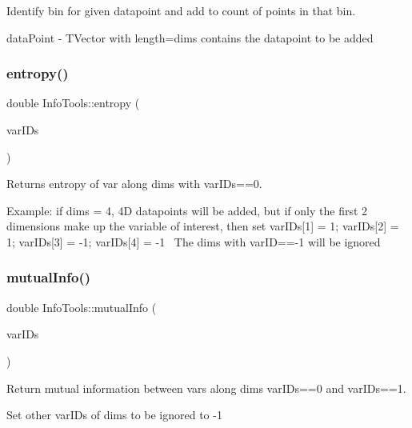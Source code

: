 Identify bin for given datapoint and add to count of points in that bin. 

data\+Point -\/ T\+Vector with length=dims contains the datapoint to be added \mbox{\label{class_info_tools_a83c1cad1553e27907dbeecde00e76660}} 
\subsubsection{\texorpdfstring{entropy()}{entropy()}}
{\footnotesize\ttfamily double Info\+Tools\+::entropy (\begin{DoxyParamCaption}\item[{T\+Vector$<$ int $>$ \&}]{var\+I\+Ds }\end{DoxyParamCaption})\hspace{0.3cm}{\ttfamily [inline]}}



Returns entropy of var along dims with var\+I\+Ds==0. 

Example\+: if dims = 4, 4D datapoints will be added, but if only the first 2 dimensions make up the variable of interest, then set var\+I\+Ds\mbox{[}1\mbox{]} = 1; var\+I\+Ds\mbox{[}2\mbox{]} = 1; var\+I\+Ds\mbox{[}3\mbox{]} = -\/1; var\+I\+Ds\mbox{[}4\mbox{]} = -\/1~\newline
The dims with var\+ID==-\/1 will be ignored \mbox{\label{class_info_tools_a1154859af94ad7d7969359ab18d24413}} 
\subsubsection{\texorpdfstring{mutual\+Info()}{mutualInfo()}}
{\footnotesize\ttfamily double Info\+Tools\+::mutual\+Info (\begin{DoxyParamCaption}\item[{T\+Vector$<$ int $>$ \&}]{var\+I\+Ds }\end{DoxyParamCaption})\hspace{0.3cm}{\ttfamily [inline]}}



Return mutual information between vars along dims var\+I\+Ds==0 and var\+I\+Ds==1. 

Set other var\+I\+Ds of dims to be ignored to -\/1 \mbox{\label{class_info_tools_a06c4b3cd30184da4ed588ef22e50bb40}} 
